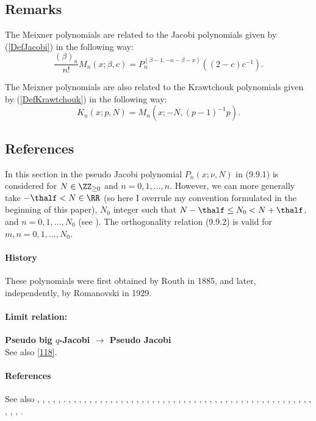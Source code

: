 \documentclass[envcountchap,graybox]{svmono}
\begin{document}
\subsection*{Remarks}
The Meixner polynomials are related to the Jacobi polynomials given by (\ref{DefJacobi})
in the following way:
$$\frac{(\beta)_n}{n!}M_n(x;\beta,c)=P_n^{(\beta-1,-n-\beta-x)}((2-c)c^{-1}).$$

\noindent
The Meixner polynomials are also related to the Krawtchouk polynomials given by
(\ref{DefKrawtchouk}) in the following way:
$$K_n(x;p,N)=M_n(x;-N,(p-1)^{-1}p).$$

\subsection*{References}
\label{sec9.9}
In this section in  the pseudo Jacobi polynomial $P_n(x;\nu,N)$ in (9.9.1)
is considered
for $N\in\ZZ_{\ge0}$ and $n=0,1,\ldots,n$. However, we can more generally take
$-\thalf<N\in\RR$ (so here I overrule my convention formulated in the
beginning of this paper), $N_0$ integer such that $N-\thalf\le N_0<N+\thalf$, and $n=0,1,\ldots,N_0$
(see ). The orthogonality relation (9.9.2)
is valid for $m,n=0,1,\ldots,N_0$.
%
\paragraph{History}
These polynomials were first obtained by Routh \cite{K13} in 1885, and later, independently,
by Romanovski  in 1929.
%
\paragraph{Limit relation:}
{\bf Pseudo big $q$-Jacobi $\longrightarrow$ Pseudo Jacobi}\\
See also \eqref{118}.
%
\paragraph{References}
See also , ,
, \cite{K11}, \cite{K10}, \cite{K12}.
%
\cite{Allaway76}, \cite{NAlSalam66}, \cite{AlSalam90}, \cite{AlSalamChihara76},
\cite{AlSalamIsmail76}, \cite{Alvarez+}, \cite{AndrewsAskey85}, \cite{Area+II}, \cite{Askey75},
\cite{Askey89I}, \cite{Askey2005}, \cite{AskeyGasper77}, \cite{AskeyIsmail76},
\cite{AskeyWilson85}, \cite{AtakRahmanSuslov}, \cite{AtakSuslov88}, \cite{Bavinck98},
\cite{BavinckHaeringen}, \cite{Campigotto+}, \cite{Chihara78}, \cite{Cooper+},
\cite{Erdelyi+}, \cite{FoataLabelle}, \cite{Gabutti}, \cite{GabuttiMathis}, \cite{Gasper73I},
\cite{Gasper74}, \cite{HoareRahman}, \cite{Ismail2005II}, \cite{IsmailLetVal88},
\cite{IsmailLi}, \cite{IsmailMuldoon}, \cite{IsmailStanton97}, \cite{JinWong},
\cite{Karlin58}, \cite{Koekoek2000}, \cite{Koorn88}, \cite{LabelleYehI}, \cite{LabelleYehII},
\cite{Lesky89}, \cite{Lesky94I}, \cite{Lesky95II}, \cite{LewanowiczII}, \cite{Meixner},
\cite{Nikiforov+}, \cite{NikiforovUvarov}, \cite{Rahman78I}, \cite{ValentAssche},
\cite{Viennot}, \cite{Zarzo+}, \cite{Zeng90}.
\end{document}
